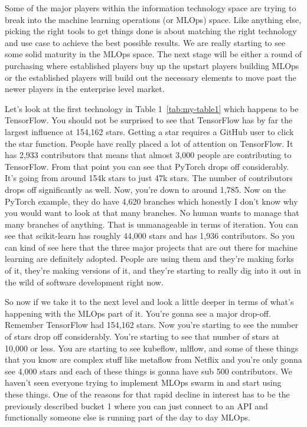 \documentclass{article}
\begin{document}
Some of the major players within the information technology space are trying to break into the machine learning operations (or MLOps) space. Like anything else, picking the right tools to get things done is about matching the right technology and use case to achieve the best possible results. We are really starting to see some solid maturity in the MLOps space. The next stage will be either a round of purchasing where established players buy up the upstart players building MLOps or the established players will build out the necessary elements to move past the newer players in the enterprise level market.

Let's look at the first technology in Table 1~\ref{tab:my-table1} which happens to be TensorFlow. You should not be surprised to see that TensorFlow has by far the largest influence at 154,162 stars. Getting a star requires a GitHub user to click the star function. People have really placed a lot of attention on TensorFlow. It has 2,933 contributors that means that almost 3,000 people are contributing to TensorFlow. From that point you can see that PyTorch drops off considerably. It's going from around 154k stars to just 47k stars. The number of contributors drops off significantly as well. Now, you're down to around 1,785. Now on the PyTorch example, they do have 4,620 branches which honestly I don't know why you would want to look at that many branches. No human wants to manage that many branches of anything. That is unmanageable in terms of iteration. You can see that scikit-learn has roughly 44,000 stars and has 1,936 contributors. So you can kind of see here that the three major projects that are out there for machine learning are definitely adopted. People are using them and they're making forks of it, they're making versions of it, and they're starting to really dig into it out in the wild of software development right now.

So now if we take it to the next level and look a little deeper in terms of what's happening with the MLOps part of it. You're gonna see a major drop-off. Remember TensorFlow had 154,162 stars. Now you're starting to see the number of stars drop off considerably. You're starting to see that number of stars at 10,000 or less. You are starting to see kubeflow, mlflow, and some of these things that you know are complex stuff like metaflow from Netflix and you're only gonna see 4,000 stars and each of these things is gonna have sub 500 contributors. We haven't seen everyone trying to implement MLOps swarm in and start using these things. One of the reasons for that rapid decline in interest has to be the previously described bucket 1 where you can just connect to an API and functionally someone else is running part of the day to day MLOps. 
\end{document}
